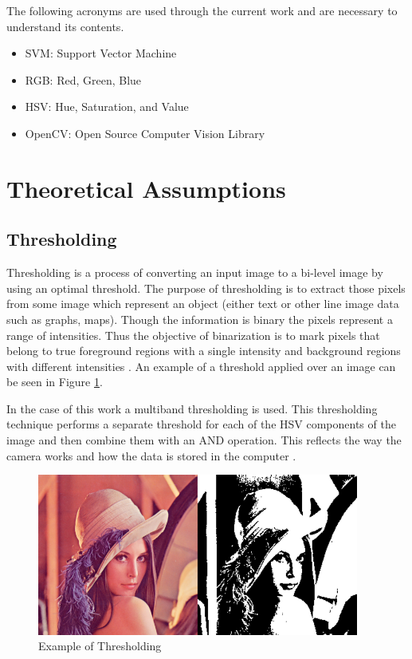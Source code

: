 \documentclass[a4paper,10pt,english]{article}
\begin{document}
        The following acronyms are used through the current work and are necessary to understand its contents.
         
        \begin{itemize}[topsep=0pt,itemsep=0ex,partopsep=1ex,parsep=1ex]
             \item SVM: Support Vector Machine
             \item RGB: Red, Green, Blue
             \item HSV: Hue, Saturation, and Value
             \item OpenCV: Open Source Computer Vision Library
         \end{itemize}
     
    \section{Theoretical Assumptions}
    
        \vspace{10pt}
        \subsection{Thresholding}
        Thresholding is a process of converting an input image to a bi-level image by using an optimal threshold. The purpose of thresholding is to extract those pixels from some image which represent an object (either text or other line image data such as graphs, maps). Though the information is binary the pixels represent a range of intensities. Thus the objective of binarization is to mark pixels that belong to true foreground regions with a single intensity and background regions with different intensities \cite{thresh:Wiki}. An example of a threshold applied over an image can be seen in Figure \ref{fig:threshold_example}.
        
        In the case of this work a multiband thresholding is used.  This thresholding technique performs a separate threshold for each of the HSV components of the image and then combine them with an AND operation. This reflects the way the camera works and how the data is stored in the computer \cite{thresh:multilevel}. 
        
        \vspace{30pt}

        \begin{figure}[h!]
            \centering
            \includegraphics[width=300pt]{images/threshold_example}
            \caption{Example of Thresholding} \label{fig:threshold_example}
        \end{figure}
        
\end{document}
